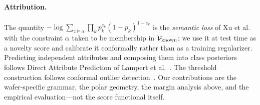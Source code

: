 \paragraph{Attribution.}
The quantity $-\log\sum_{z\models\alpha}\prod_k p_k^{z_k}(1-p_k)^{1-z_k}$ is the \emph{semantic loss}
of Xu et al.~\cite{xu2018semantic} with the constraint $\alpha$ taken to be membership in $\mathcal{V}_{\mathrm{known}}$;
we use it at test time as a novelty score and calibrate it conformally rather than as a training
regularizer. Predicting independent attributes and composing them into class
posteriors follows Direct Attribute Prediction of Lampert et al.~\cite{lampert2014attribute}.
The threshold construction follows conformal outlier detection~\cite{bates2023conformal}. Our
contributions are the wafer-specific grammar, the polar geometry, the margin analysis above, and the
empirical evaluation---not the score functional itself.
